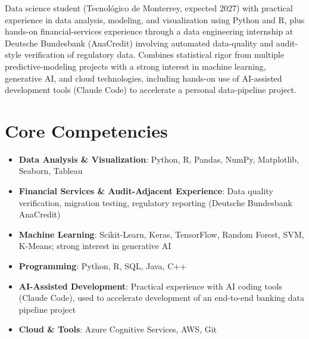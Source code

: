 \documentclass[11pt,a4paper,sans]{moderncv}
\begin{document}
\makecvtitle


\vspace{6pt}
\small{Data science student (Tecnológico de Monterrey, expected 2027) with practical experience in data analysis, modeling, and visualization using Python and R, plus hands-on financial-services experience through a data engineering internship at Deutsche Bundesbank (AnaCredit) involving automated data-quality and audit-style verification of regulatory data. Combines statistical rigor from multiple predictive-modeling projects with a strong interest in machine learning, generative AI, and cloud technologies, including hands-on use of AI-assisted development tools (Claude Code) to accelerate a personal data-pipeline project.}


\section{Core Competencies}
\vspace{1pt}
\begin{itemize}

\item \textbf{Data Analysis \& Visualization}: Python, R, Pandas, NumPy, Matplotlib, Seaborn, Tableau

\item \textbf{Financial Services \& Audit-Adjacent Experience}: Data quality verification, migration testing, regulatory reporting (Deutsche Bundesbank AnaCredit)

\item \textbf{Machine Learning}: Scikit-Learn, Keras, TensorFlow, Random Forest, SVM, K-Means; strong interest in generative AI

\item \textbf{Programming}: Python, R, SQL, Java, C++

\item \textbf{AI-Assisted Development}: Practical experience with AI coding tools (Claude Code), used to accelerate development of an end-to-end banking data pipeline project

\item \textbf{Cloud \& Tools}: Azure Cognitive Services, AWS, Git

\end{itemize}
\end{document}
